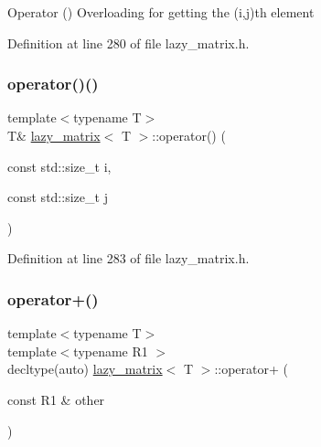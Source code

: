 Operator () Overloading for getting the (i,j)th element 

Definition at line 280 of file lazy\+\_\+matrix.\+h.

\mbox{\label{classlazy__matrix_ad87bc3cf498acf5480fc0a539c5d3a0a}} 
\subsubsection{\texorpdfstring{operator()()}{operator()()}\hspace{0.1cm}{\footnotesize\ttfamily [2/2]}}
{\footnotesize\ttfamily template$<$typename T$>$ \\
T\& \mbox{\hyperlink{classlazy__matrix}{lazy\+\_\+matrix}}$<$ T $>$\+::operator() (\begin{DoxyParamCaption}\item[{const std\+::size\+\_\+t}]{i,  }\item[{const std\+::size\+\_\+t}]{j }\end{DoxyParamCaption})\hspace{0.3cm}{\ttfamily [inline]}}



Definition at line 283 of file lazy\+\_\+matrix.\+h.

\mbox{\label{classlazy__matrix_a591fc5b952ef341dcb3a20051fd7aa96}} 
\subsubsection{\texorpdfstring{operator+()}{operator+()}}
{\footnotesize\ttfamily template$<$typename T$>$ \\
template$<$typename R1 $>$ \\
decltype(auto) \mbox{\hyperlink{classlazy__matrix}{lazy\+\_\+matrix}}$<$ T $>$\+::operator+ (\begin{DoxyParamCaption}\item[{const R1 \&}]{other }\end{DoxyParamCaption})\hspace{0.3cm}{\ttfamily [inline]}}



